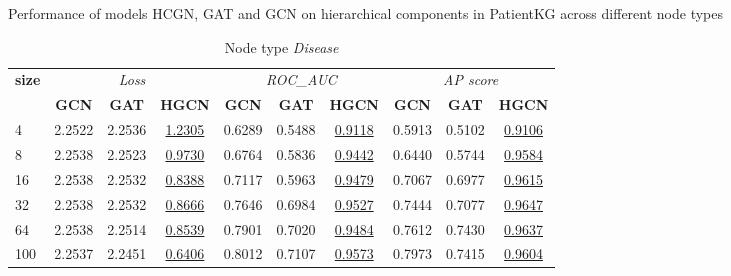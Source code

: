 \begin{table} 
    \centering
    \caption{Performance of models HCGN, GAT and GCN on hierarchical components in PatientKG across different node types}
    \label{tab:tabHypPerf}  
    \begin{subtable}[t]{\textwidth}
        \centering
        \begin{tabular}{l|ccc|ccc|ccc}        
            \toprule
            \multirow{2}{*}{\textbf{size}} & \multicolumn{3}{c|}{\textit{Loss}} & \multicolumn{3}{c|}{\textit{ROC\_AUC}} & \multicolumn{3}{c}{\textit{AP score}} \\
            & \textbf{GCN} & \textbf{GAT} & \textbf{HGCN} & \textbf{GCN} & \textbf{GAT} & \textbf{HGCN} & \textbf{GCN} & \textbf{GAT} & \textbf{HGCN} \\
            \midrule
                4 & 2.2522 & 2.2536 & \underline{1.2305} & 0.6289 & 0.5488 & \underline{0.9118} & 0.5913 & 0.5102 & \underline{0.9106} \\  
                8 & 2.2538 & 2.2523 & \underline{0.9730} & 0.6764 & 0.5836 & \underline{0.9442} & 0.6440 & 0.5744 & \underline{0.9584} \\
                16 & 2.2538 & 2.2532 & \underline{0.8388} & 0.7117 & 0.5963 & \underline{0.9479} & 0.7067 & 0.6977 & \underline{0.9615} \\
                32 & 2.2538 & 2.2532 & \underline{0.8666} & 0.7646 & 0.6984 & \underline{0.9527} & 0.7444 & 0.7077 & \underline{0.9647} \\
                64 & 2.2538 & 2.2514 & \underline{0.8539} & 0.7901 & 0.7020 & \underline{0.9484} & 0.7612 & 0.7430 & \underline{0.9637} \\
                100 & 2.2537 & 2.2451 & \underline{0.6406} & 0.8012 & 0.7107 & \underline{0.9573} & 0.7973 & 0.7415 & \underline{0.9604} \\
            \bottomrule
        \end{tabular}
        \caption{Node type \textit{Disease}}
    \end{subtable}
    
    \vspace{1em}
    

\end{table}
